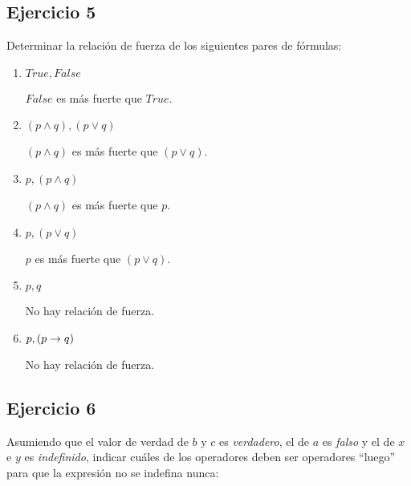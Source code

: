 \subsection{Ejercicio 5}
Determinar la relación de fuerza de los siguientes pares de fórmulas:

\begin{enumerate}[label=\alph*)]
      \item $True, False$

            $False$ es más fuerte que $True$.

      \item $(p \land q), (p \lor q)$

            $(p \land q)$ es más fuerte que $(p \lor q)$.

      \item $p, (p \land q)$

            $(p \land q)$ es más fuerte que $p$.

      \item $p, (p \lor q)$

            $p$ es más fuerte que $(p \lor q)$.

      \item $p, q$

            No hay relación de fuerza.

      \item $p, (p \rightarrow q)$

            No hay relación de fuerza.
\end{enumerate}

\subsection{Ejercicio 6}
Asumiendo que el valor de verdad de $b$ y $c$ es \textit{verdadero}, el de $a$ es \textit{falso} y el de $x$ e $y$ es \textit{indefinido}, indicar cuáles de los operadores deben ser operadores ``luego'' para que la expresión no se indefina nunca:

